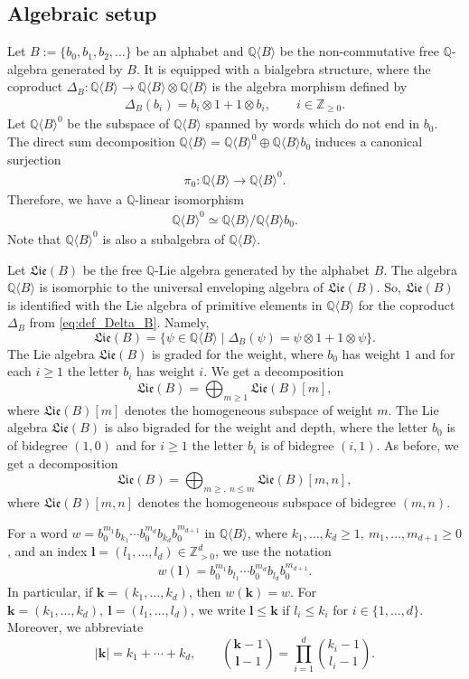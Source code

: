 \documentclass[11pt, a4paper]{amsart}
\numberwithin{equation}{section}
\theoremstyle{definition}
\newcommand{\Q}{\mathbb{Q}}
\newcommand{\QB}{\Q\langle B\rangle}
\newcommand{\Lie}{\mathfrak{Lie}}
\begin{document}
\subsection{Algebraic setup} Let $B := \{b_0, b_1, b_2, \ldots\}$ be an alphabet and $\QB$ be the non-commutative free $\Q$-algebra generated by $B$. It is equipped with a bialgebra structure, where the coproduct $\Delta_B:\QB\to\QB\otimes\QB$ is the algebra morphism defined by
\begin{align} \label{eq:def_Delta_B}
\Delta_B(b_i)= b_i\otimes 1+1\otimes b_i, \qquad i\in \mathbb{Z}_{\geq 0}.
\end{align}
Let $\QB^0$ be the subspace of $\QB$ spanned by words which do not end in $b_0$. The direct sum decomposition $\QB=\QB^0\oplus\QB b_0$ induces a canonical surjection
\begin{align*}
\pi_0:\QB\to \QB^0.
\end{align*}
Therefore, we have a $\Q$-linear isomorphism
\begin{align} \label{eq:QB^0_iso_QB/QB b_0}
\QB^0 \simeq \QB/\QB b_0.
\end{align}
Note that $\QB^0$ is also a subalgebra of $\QB$.

Let $\Lie(B)$ be the free $\Q$-Lie algebra generated by the alphabet $B$. The algebra $\QB$ is isomorphic to the universal enveloping algebra of $\Lie(B)$. So, $\Lie(B)$ is identified with the Lie algebra of primitive elements in $\QB$ for the coproduct $\Delta_B$ from \eqref{eq:def_Delta_B}. Namely,
\[
    \Lie(B) = \{ \psi \in \QB \mid \Delta_B(\psi) = \psi \otimes 1 + 1 \otimes \psi \}.
\]
The Lie algebra $\Lie(B)$ is graded for the weight, where $b_0$ has weight $1$ and for each $i\geq1$ the letter $b_i$ has weight $i$. We get a decomposition
\[
\Lie(B)=\bigoplus_{m\geq1} \Lie(B)[m],
\]
where $\Lie(B)[m]$ denotes the homogeneous subspace of weight $m$. The Lie algebra $\Lie(B)$ is also bigraded for the weight and depth, where the letter $b_0$ is of bidegree $(1,0)$ and for $i\geq1$ the letter $b_i$ is of bidegree $(i,1)$. As before, we get a decomposition
\[
\Lie(B)=\bigoplus_{m\geq,\ n\leq m} \Lie(B)[m,n],
\]
where $\Lie(B)[m,n]$ denotes the homogeneous subspace of bidegree $(m,n)$.

For a word $w=b_0^{m_1}b_{k_1}\cdots b_0^{m_d}b_{k_d}b_0^{m_{d+1}}$ in $\QB$, where $k_1,\ldots,k_d\geq1,\ m_1,\ldots,m_{d+1}\geq0$, and an index $\mathbf{l}=(l_1,\ldots,l_d)\in \mathbb{Z}_{>0}^d$, we use the notation
\begin{align*}
w(\mathbf{l})=b_0^{m_1}b_{l_1}\cdots b_0^{m_d}b_{l_d}b_0^{m_{d+1}}.
\end{align*}
In particular, if $\mathbf{k}=(k_1,\ldots,k_d)$, then $w(\mathbf{k})=w$. For $\mathbf{k}=(k_1,\ldots,k_d),\ \mathbf{l}=(l_1,\ldots,l_d)$, we write $\mathbf{l}\leq\mathbf{k}$ if $l_i\leq k_i$ for $i\in\{1,\ldots,d\}$. Moreover, we abbreviate
\[|\mathbf{k}|=k_1+\cdots+k_d,\qquad \binom{\mathbf{k}-1}{\mathbf{l}-1}=\prod_{i=1}^d \binom{k_i-1}{l_i-1}. \]
\end{document}
